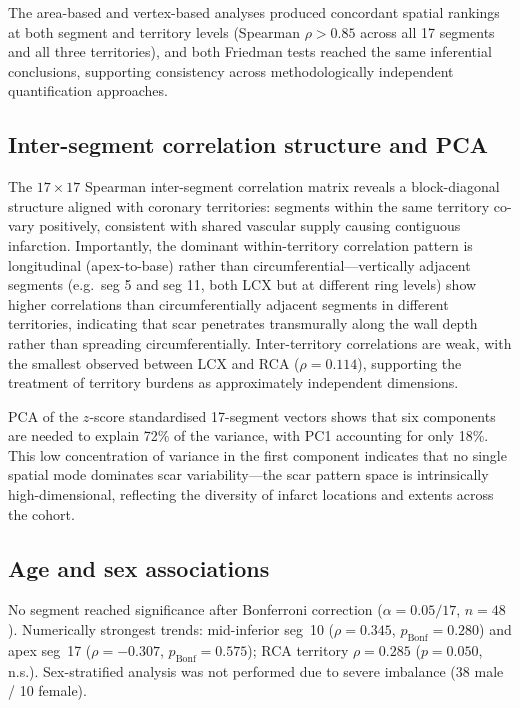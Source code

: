 The area-based and vertex-based analyses produced concordant spatial rankings at both
segment and territory levels (Spearman $\rho > 0.85$ across all 17 segments and all three
territories), and both Friedman tests reached the same inferential conclusions, supporting
consistency across methodologically independent quantification approaches.

\subsection{Inter-segment correlation structure and PCA}

The $17 \times 17$ Spearman inter-segment correlation matrix reveals a block-diagonal
structure aligned with coronary territories: segments within the same territory co-vary
positively, consistent with shared vascular supply causing contiguous infarction. Importantly,
the dominant within-territory correlation pattern is longitudinal (apex-to-base) rather than
circumferential---vertically adjacent segments (e.g.\ seg 5 and seg 11, both LCX but at
different ring levels) show higher correlations than circumferentially adjacent segments in
different territories, indicating that scar penetrates transmurally along the wall depth rather
than spreading circumferentially. Inter-territory correlations are weak, with the smallest
observed between LCX and RCA ($\rho = 0.114$), supporting the treatment of territory
burdens as approximately independent dimensions.

PCA of the $z$-score standardised 17-segment vectors shows that six components are
needed to explain 72\% of the variance, with PC1 accounting for only 18\%. This low
concentration of variance in the first component indicates that no single spatial mode
dominates scar variability---the scar pattern space is intrinsically high-dimensional, reflecting
the diversity of infarct locations and extents across the cohort.

\subsection{Age and sex associations}

No segment reached significance after Bonferroni correction ($\alpha = 0.05/17$, $n = 48$).
Numerically strongest trends: mid-inferior seg~10 ($\rho = 0.345$, $p_\text{Bonf} = 0.280$)
and apex seg~17 ($\rho = -0.307$, $p_\text{Bonf} = 0.575$); RCA territory $\rho = 0.285$
($p = 0.050$, n.s.). Sex-stratified analysis was not performed due to severe imbalance
(38 male / 10 female).

